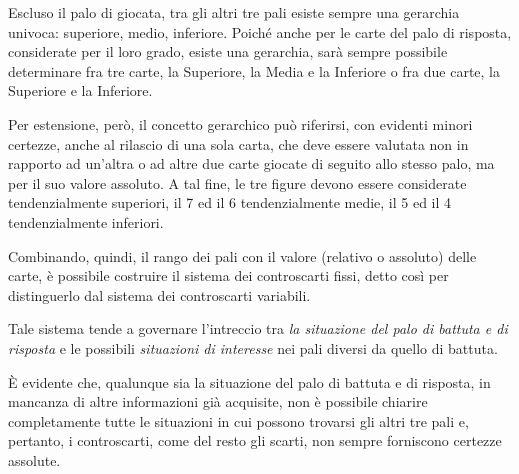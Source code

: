 \documentclass[italian,a4paper]{article}
\begin{document}
Escluso il palo di giocata, tra gli altri tre pali esiste sempre una gerarchia univoca: superiore, medio, inferiore.
Poiché anche per le carte del palo di risposta, considerate per il loro
grado, esiste una gerarchia, sarà sempre possibile determinare fra tre
carte, la Superiore, la Media e la Inferiore o fra due carte, la Superiore e la Inferiore.

Per estensione, però, il concetto gerarchico può riferirsi, con evidenti minori certezze, anche al rilascio di una sola carta, che deve essere valutata non in rapporto ad un'altra o ad altre due carte giocate di seguito allo stesso palo, ma per il suo valore assoluto. A tal fine, le tre figure devono essere considerate tendenzialmente superiori, il 7 ed il 6 tendenzialmente medie, il 5 ed il 4 tendenzialmente inferiori.
 
Combinando, quindi, il rango dei pali con il valore (relativo o assoluto) delle carte, è possibile costruire il sistema dei controscarti fissi, detto così per distinguerlo dal sistema dei controscarti variabili.

Tale sistema tende a governare l'intreccio tra \emph{la situazione del palo
di battuta e di risposta} e le possibili \emph{situazioni di interesse} nei pali diversi da quello di battuta.  

\`E evidente che, qualunque sia la situazione del palo di battuta e di risposta, in mancanza di altre informazioni già acquisite, non è possibile chiarire completamente tutte le situazioni in cui possono trovarsi gli altri tre pali e, pertanto, i controscarti, come del resto gli scarti, non sempre forniscono certezze assolute. 
\end{document}
